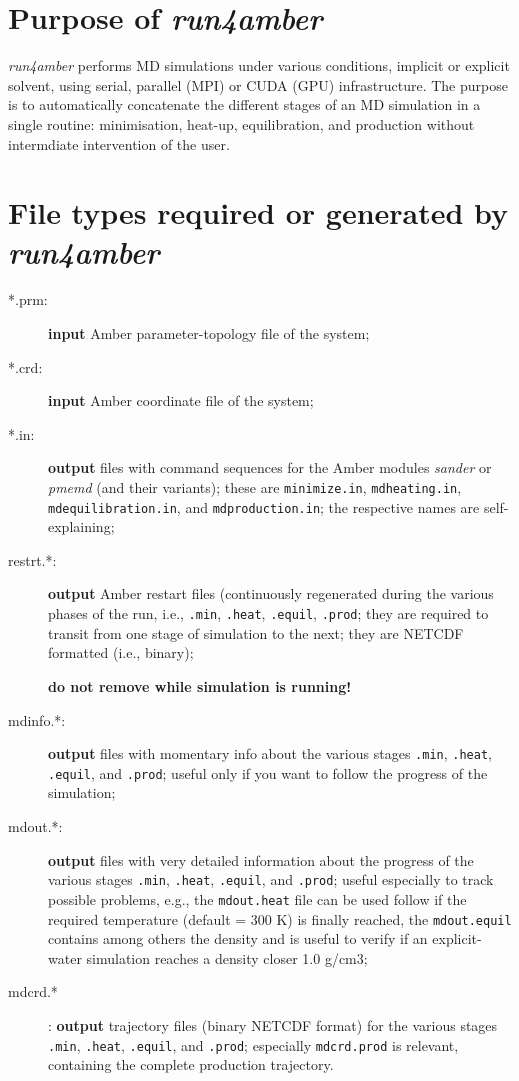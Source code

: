\documentclass[10pt,landscape,twocolumn]{article}
\begin{document}
\section{Purpose of \textsl{run4amber}}
\textsl{run4amber} performs MD simulations under various conditions, implicit or explicit solvent, using serial, parallel (MPI) or CUDA (GPU) infrastructure. The purpose is to automatically concatenate the different stages of an MD simulation in a single routine: minimisation, heat-up, equilibration, and production without intermdiate intervention of the user.

\section{File types required or generated by \textsl{run4amber}}

\begin{description}
\item[*.prm:] \textbf{input} Amber parameter-topology file of the system;
\item[*.crd:] \textbf{input} Amber coordinate file of the system;
\item[*.in:] \textbf{output} files with command sequences for the Amber modules \textsl{sander} or \textsl{pmemd} (and their variants); these are \texttt{minimize.in}, \texttt{mdheating.in}, \texttt{mdequilibration.in}, and \texttt{mdproduction.in}; the respective names are self-explaining;
\item[restrt.*:] \textbf{output} Amber restart files (continuously regenerated during the various phases of the run, i.e.,  \texttt{.min}, \texttt{.heat}, \texttt{.equil}, \texttt{.prod}; they are required to transit from one stage of simulation to the next; they are NETCDF formatted (i.e., binary); \begin{mdframed}\textbf{do not remove while simulation is running!}
\end{mdframed}  

\item[mdinfo.*:] \textbf{output} files with momentary info about the various stages \texttt{.min}, \texttt{.heat}, \texttt{.equil}, and \texttt{.prod}; useful only if you want to follow the progress of the simulation;

\item[mdout.*:] \textbf{output} files with very detailed information about the progress of the various stages \texttt{.min}, \texttt{.heat}, \texttt{.equil}, and \texttt{.prod}; useful especially to track possible problems, e.g., the \texttt{mdout.heat} file can be used follow if the required temperature (default = 300 K) is finally reached, the \texttt{mdout.equil} contains among others the density and is useful to verify if an explicit-water simulation reaches a density closer 1.0 g/cm3;

\item[mdcrd.*] : \textbf{output} trajectory files (binary NETCDF format) for the various stages \texttt{.min}, \texttt{.heat}, \texttt{.equil}, and \texttt{.prod}; especially \texttt{mdcrd.prod} is relevant, containing the complete production trajectory.
\end{description}
\end{document}
